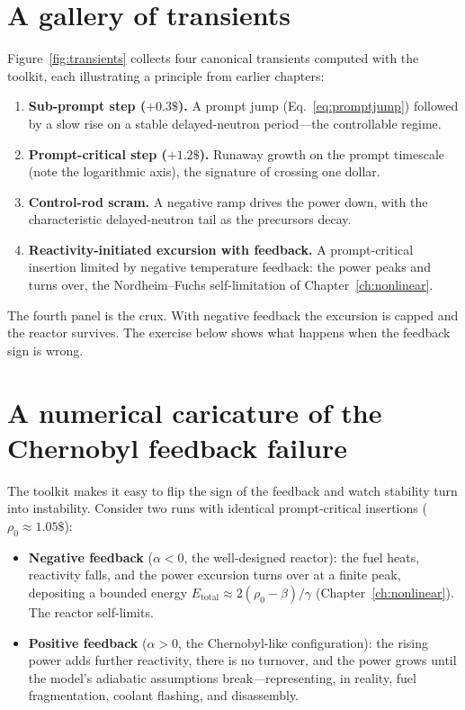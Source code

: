 \section{A gallery of transients}

Figure~\ref{fig:transients} collects four canonical transients computed with the
toolkit, each illustrating a principle from earlier chapters:

\begin{enumerate}[nosep]
\item \textbf{Sub-prompt step ($+0.3\$$).} A prompt jump
(Eq.~\ref{eq:promptjump}) followed by a slow rise on a stable delayed-neutron
period---the controllable regime.
\item \textbf{Prompt-critical step ($+1.2\$$).} Runaway growth on the prompt
timescale (note the logarithmic axis), the signature of crossing one dollar.
\item \textbf{Control-rod scram.} A negative ramp drives the power down, with the
characteristic delayed-neutron tail as the precursors decay.
\item \textbf{Reactivity-initiated excursion with feedback.} A prompt-critical
insertion limited by negative temperature feedback: the power peaks and turns
over, the Nordheim--Fuchs self-limitation of Chapter~\ref{ch:nonlinear}.
\end{enumerate}

The fourth panel is the crux. With negative feedback the excursion is capped and
the reactor survives. The exercise below shows what happens when the feedback sign
is wrong.

\section{A numerical caricature of the Chernobyl feedback failure}

The toolkit makes it easy to flip the sign of the feedback and watch stability
turn into instability. Consider two runs with identical prompt-critical insertions
($\rho_0\approx 1.05\$$):

\begin{itemize}[nosep]
\item \textbf{Negative feedback} ($\alpha<0$, the well-designed reactor): the
fuel heats, reactivity falls, and the power excursion turns over at a finite peak,
depositing a bounded energy $E_{\text{total}}\approx 2(\rho_0-\beta)/\gamma$
(Chapter~\ref{ch:nonlinear}). The reactor self-limits.
\item \textbf{Positive feedback} ($\alpha>0$, the Chernobyl-like configuration):
the rising power adds further reactivity, there is no turnover, and the power grows
until the model's adiabatic assumptions break---representing, in reality, fuel
fragmentation, coolant flashing, and disassembly.
\end{itemize}

